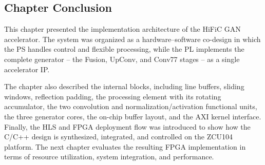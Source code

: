 \subsection{Chapter Conclusion}

This chapter presented the implementation architecture of the HiFiC GAN accelerator. The system was organized as a hardware--software co-design in which the PS handles control and flexible processing, while the PL implements the complete generator -- the Fusion, UpConv, and Conv77 stages -- as a single accelerator IP.

The chapter also described the internal blocks, including line buffers, sliding windows, reflection padding, the processing element with its rotating accumulator, the two convolution and normalization/activation functional units, the three generator cores, the on-chip buffer layout, and the AXI kernel interface. Finally, the HLS and FPGA deployment flow was introduced to show how the C/C++ design is synthesized, integrated, and controlled on the ZCU104 platform. The next chapter evaluates the resulting FPGA implementation in terms of resource utilization, system integration, and performance.